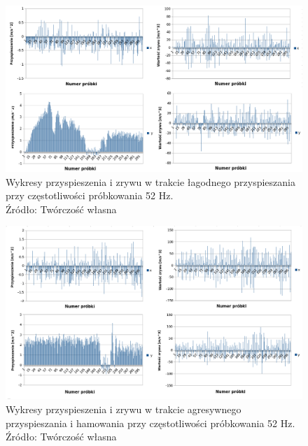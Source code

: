 \begin{figure}[H]
	\centering
	\includegraphics[width=15cm]{img/driving_analysis/lagodne_przyspieszanie_52.png}
	\caption{Wykresy przyspieszenia i zrywu w trakcie łagodnego przyspieszania przy częstotliwości próbkowania 52 Hz.
	\\Źródło: Twórczość własna}
	\label{fig:image_driving_analysis_test_acc_light52Hz}
\end{figure}

\begin{figure}[H]
	\centering
	\includegraphics[width=15cm]{img/driving_analysis/Ostre_przyspieszenie_52Hz.png}
	\caption{Wykresy przyspieszenia i zrywu w trakcie agresywnego przyspieszania i hamowania przy częstotliwości próbkowania 52 Hz.
	\\Źródło: Twórczość własna}
	\label{fig:image_driving_analysis_test_acc_hard52Hz}
\end{figure}

